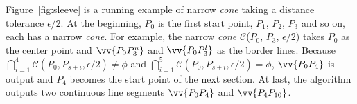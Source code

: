 \begin{example}
\label{exm-alg-sleeve}
Figure~\ref{fig:sleeve} is a running example of narrow \emph{cone} taking a distance tolerance $\epsilon/2$. At the beginning, $P_0$ is the first start point, $P_1$, $P_2$, $P_3$ and so on, each has a narrow \emph{cone}.
For example, the narrow \emph{cone} $\mathcal{C}$($P_0$, $P_{3}$, $\epsilon/2$) takes $P_0$ as the center point and $\vv{P_0P^u_{3}}$ and $\vv{P_0P^l_{3}}$ as the border lines.
Because $\bigcap_{i=1}^{4}\mathcal{C}(P_0, P_{s+i}, \epsilon/2) \ne \phi$ and $\bigcap_{i=1}^{5}\mathcal{C}(P_0, P_{s+i}, \epsilon/2) = \phi$, $\vv{P_0P_4}$ is output and $P_4$ becomes the start point of the next section.
At last, the algorithm outputs two continuous line segments $\vv{P_0P_4}$ and $\vv{P_4P_{10}}$.
\end{example}





